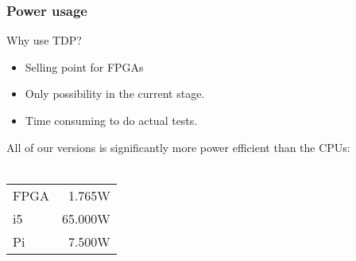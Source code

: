 \begin{frame}
  \frametitle{Power usage}
  \fontsize{8pt}{10}\selectfont
  Why use TDP?\\
  \begin{itemize}
    \item Selling point for FPGAs
    \item Only possibility in the current stage.
    \item Time consuming to do actual tests.
  \end{itemize}
  All of our versions is significantly more power efficient than the CPUs:\\~\\
  \begin{tabular}{l r}
    FPGA & 1.765W\\
    i5 & 65.000W\\
    Pi & 7.500W
  \end{tabular}
\end{frame}
